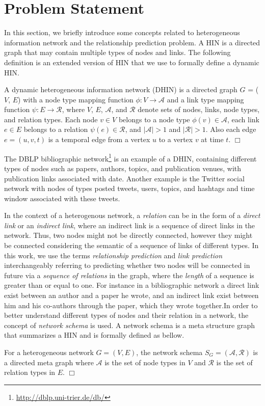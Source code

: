 \section{Problem Statement}

In this section, we briefly introduce some concepts related to heterogeneous information network and the relationship prediction problem. A HIN is a directed graph that may contain multiple types of nodes and links. The following definition is an extended version of HIN \cite{sun2011pathsim} that we use to formally define a dynamic HIN.

\begin{definition} A dynamic heterogeneous information network (DHIN) is a directed graph $G$ = ($V$, $E$) with a node type mapping function $\phi: V \rightarrow \mathcal{A}$ and a link type mapping function $\psi: E \rightarrow \mathcal{R}$, where $V$, $E$, $\mathcal{A}$, and $\mathcal{R}$ denote sets of nodes, links, node types, and relation types. Each node $v \in V$ belongs to a node type $\phi(v) \in \mathcal{A}$, each link $e \in E$ belongs to a relation $\psi(e) \in \mathcal{R}$, and $|\mathcal{A}| > 1$ and $|\mathcal{R}| > 1$. Also each edge $e = (u, v, t)$ is a temporal edge from a vertex $u$ to a vertex $v$ at time $t$. $\Box$ \end{definition}

The DBLP bibliographic network\footnote{\url{http://dblp.uni-trier.de/db/}} is an example of a DHIN, containing different types of nodes such as papers, authors, topics, and publication venues, with publication links associated with date. Another example is the Twitter social network with nodes of types posted tweets, users, topics, and hashtags and time window associated with these tweets. 

In the context of a heterogenous network, a \textit{relation} can be in the form of a \textit{direct link} or an \textit{indirect link}, where an indirect link is a sequence of direct links in the network. Thus, two nodes might not be directly connected, however they might be connected considering the semantic of a sequence of links of different types. In this work, we use the terms \textit{relationship prediction} and \textit{link prediction} interchangeably referring to predicting whether two nodes will be connected in future via a \textit{sequence of relations} in the graph, where the \textit{length} of a sequence is greater than or equal to one. For instance in a bibliographic network a direct link exist between an author and a paper he wrote, and an indirect link exist between him and his co-authors through the paper, which they wrote together.In order to better understand different types of nodes and their relation in a network, the concept of \textit{network schema} \cite{sun2011pathsim} is used. A network schema is a meta structure graph that summarizes a HIN and is formally defined as bellow.\begin{definition}For a heterogeneous network $G=(V,E)$, the network schema $S_G=\mathcal{(A,R)}$ is a directed meta graph where $\mathcal{A}$ is the set of node types in $V$ and $\mathcal{R}$ is the set of relation types in $E$.  $\Box$\end{definition}

